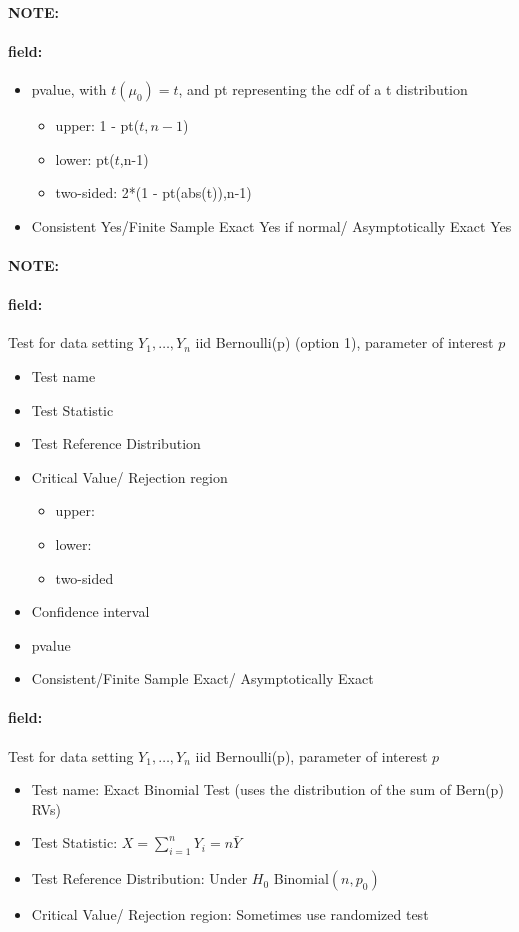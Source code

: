 \documentclass[12pt]{article}
\newenvironment{note}{\paragraph{NOTE:}}{}
\newenvironment{field}{\paragraph{field:}}{}
\begin{document}
\begin{note}
\begin{field}
\begin{itemize}
   \item pvalue, with $t(\mu_0)  = t$, and pt representing the cdf of a t distribution
         \begin{itemize}
          \item upper: 1 - pt($t,n-1$)
          \item lower: pt($t$,n-1)
          \item two-sided: 2*(1 - pt(abs(t)),n-1)
         \end{itemize}
   \item Consistent Yes/Finite Sample Exact Yes if normal/ Asymptotically Exact Yes
  \end{itemize}
 \end{field}
\end{note}


\begin{note}
 \begin{field}
  Test for data setting $Y_1, \ldots, Y_n$ iid Bernoulli(p) (option 1), parameter of interest $p$
  \begin{itemize}
   \item Test name
   \item Test Statistic
   \item Test Reference Distribution
   \item Critical Value/ Rejection region
         \begin{itemize}
          \item upper:
          \item lower:
          \item two-sided
         \end{itemize}
   \item Confidence interval
   \item pvalue
   \item Consistent/Finite Sample Exact/ Asymptotically Exact
  \end{itemize}
 \end{field}
 \begin{field}
  Test for data setting $Y_1, \ldots, Y_n$ iid Bernoulli(p), parameter of interest $p$
  \begin{itemize}
   \item Test name: Exact Binomial Test (uses the distribution of the sum of Bern(p) RVs)
   \item Test Statistic: $X = \sum_{i=1}^n Y_i = n\bar{Y}$
   \item Test Reference Distribution: Under $H_0$ Binomial$(n,p_0)$
   \item Critical Value/ Rejection region: Sometimes use randomized test

\end{itemize}
\end{field}
\end{note}
\end{document}
